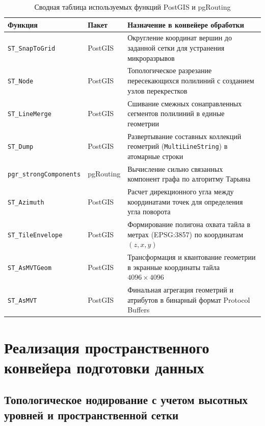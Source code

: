 \begin{table}[htbp]
\small
\centering
\caption{Сводная таблица используемых функций PostGIS и pgRouting}
\label{tab:functions_summary}
\begin{tabularx}{\linewidth}{|l|l|X|}
\hline
\textbf{Функция} & \textbf{Пакет} & \textbf{Назначение в конвейере обработки} \\ \hline
\texttt{ST\_SnapToGrid} & PostGIS & Округление координат вершин до заданной сетки для устранения микроразрывов \\ \hline
\texttt{ST\_Node} & PostGIS & Топологическое разрезание пересекающихся полилиний с созданием узлов перекрестков \\ \hline
\texttt{ST\_LineMerge} & PostGIS & Сшивание смежных сонаправленных сегментов полилиний в единые геометрии \\ \hline
\texttt{ST\_Dump} & PostGIS & Развертывание составных коллекций геометрий (\texttt{MultiLineString}) в атомарные строки \\ \hline
\texttt{pgr\_strongComponents} & pgRouting & Вычисление сильно связанных компонент графа по алгоритму Тарьяна~\cite{tarjan2020algorithm} \\ \hline
\texttt{ST\_Azimuth} & PostGIS & Расчет дирекционного угла между координатами точек для определения угла поворота \\ \hline
\texttt{ST\_TileEnvelope} & PostGIS & Формирование полигона охвата тайла в метрах (EPSG:3857) по координатам $(z, x, y)$ \\ \hline
\texttt{ST\_AsMVTGeom} & PostGIS & Трансформация и квантование геометрии в экранные координаты тайла $4096 \times 4096$ \\ \hline
\texttt{ST\_AsMVT} & PostGIS & Финальная агрегация геометрий и атрибутов в бинарный формат Protocol Buffers \\ \hline
\end{tabularx}
\end{table}

\section{Реализация пространственного конвейера подготовки данных}
\label{sec:spatial_pipeline}

\subsection{Топологическое нодирование с учетом высотных уровней и пространственной сетки}

